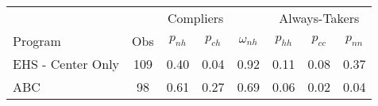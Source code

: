\begin{tabular}{lccccccc}
\toprule 
\midrule 
\multicolumn{2}{c}{} & \multicolumn{2}{c}{Compliers} &  & \multicolumn{3}{c}{Always-Takers} \\
 \cmidrule(lr){3-4} \cmidrule(lr){6-8} 
Program & Obs & $p_{nh}$ & $p_{ch}$ & $\omega_{nh}$ & $p_{hh}$ & $p_{cc}$ & $p_{nn}$ \\
\midrule 
EHS - Center Only & 109 & 0.40 & 0.04 & 0.92 & 0.11 & 0.08 & 0.37 \\
ABC & 98 & 0.61 & 0.27 & 0.69 & 0.06 & 0.02 & 0.04 \\
\midrule 
\bottomrule 
\end{tabular}
